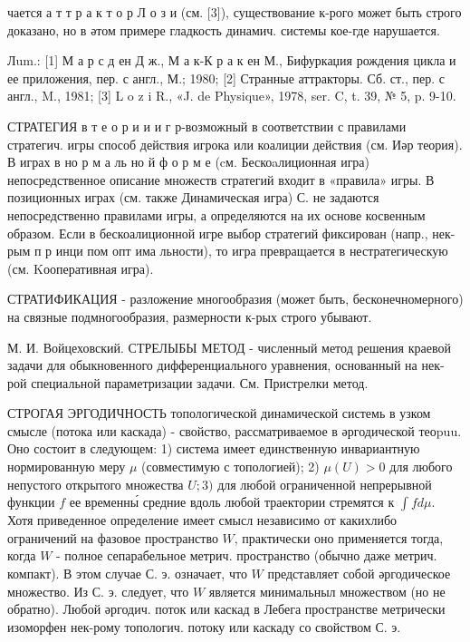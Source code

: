 \documentclass[10pt]{article}
\begin{document}
чается а т т р а к т о р Л о з и (см. [3]), существование к-рого может быть строго доказано, но в әтом примере гладкость динамич. системы кое-где нарушается.



Лum.: [1] М а р с д ен Д ж., М а к-К р а к ен М., Бифуркаџия рождения цикла и ее приложения, пер. с англ., М.; 1980; [2] Странные аттракторы. Сб. ст., пер. с англ., M., 1981; [3] L o z i R., «J. de Physique», 1978, ser. C, t. 39, № 5, p. 9-10.



СТРАТЕГИЯ в т е о р и и и г р-возможный в соответствии с правилами стратегич. игры способ действия игрока или коалиции действия (см. Иәр теория). В играх в но р м а ль но й ф о р м е (cм. Бескоaлиционная игра) непосредственное описание множеств стратегий входит в «правила» игры. В позиционных играх (см. также Динамическая игра) С. не задаются непосредственно правилами игры, а определяются на их основе косвенным образом. Если в бескоалиционной игре выбор стратегий фиксирован (напр., нек-рым п р инци пом опт има льности), то игра превращается в нестратегическую (см. Kооперативная игра).



СТРАТИФИКАЦИЯ - разложение многообразия (может быть, бесконечномерного) на связные подмногообразия, размерности к-рых строго убывают.



М. И. Войцеховский. СТРЕЛЫБЫ МЕТОД - численный метод решения краевой задачи для обыкновенного дифференциального уравнения, основанный на нек-рой специальной параметризации задачи. См. Пристрелки метод.



СТРОГАЯ ЭРГОДИЧНОСТЬ топологической динамической системь в узком смысле (потока или каскада) - свойство, рассматриваемое в әргодической теоpuu. Оно состоит в следующем: 1) система имеет единственную инвариантную нормированную меру $\mu$ (совместимую с топологией); 2) $\mu(U)>0$ для любого непустого открытого множества $U ; 3)$ для любой ограниченной непрерывной функции $f$ ее временны́ средние вдоль любой траектории стремятся к $\int f d \mu$. Хотя приведенное определение имеет смысл независимо от какихлибо ограничений на фазовое пространство $W$, практически оно применяется тогда, когда $W$ - полное сепарабельное метрич. пространство (обычно даже метрич. компакт). В этом случае С. э. означает, что $W$ представляет собой әргодическое множество. Из С. э. следует, что $W$ является минимальныл множеством (но не обратно). Любой әргодич. поток или каскад в Лебега пространстве метрически изоморфен нек-рому топологич. потоку или каскаду со свойством С. э.
\end{document}

